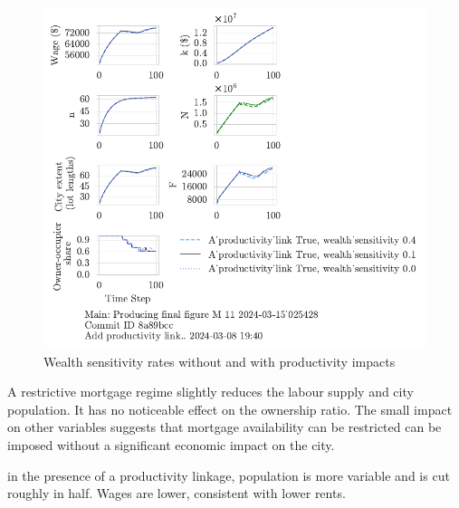 \begin{figure}[h!tb]
    \includegraphics[scale=.75, trim={0 1.4cm 4.75cm 0},clip]{fig/With-productivity_link-wealth_sensitivity-025428.pdf} 
    \caption{Wealth sensitivity rates without and with productivity impacts}
    \label{fig:Productivity_link_W-WO-wealth}
\end{figure}
A restrictive mortgage regime slightly reduces the labour supply and city population. It has no noticeable effect on the ownership ratio. The small impact on other variables suggests that mortgage availability can be restricted can be imposed without a significant economic impact on the city. 

in the presence of a productivity linkage, population is more variable and is cut roughly in half. Wages are lower, consistent with lower rents.

\newpage
